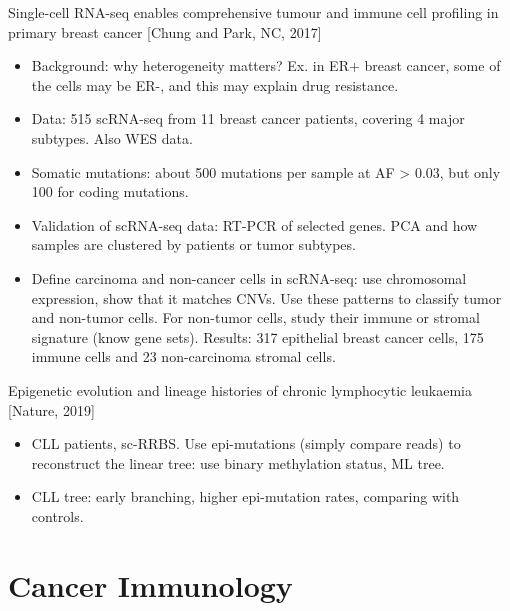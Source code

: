 \documentclass{report}
\begin{document}
Single-cell RNA-seq enables comprehensive tumour and immune cell profiling in primary breast cancer [Chung and Park, NC, 2017]
\begin{itemize}
	
	\item Background: why heterogeneity matters? Ex. in ER+ breast cancer, some of the cells may be ER-, and this may explain drug resistance.
	
	\item Data: 515 scRNA-seq from 11 breast cancer patients, covering 4 major subtypes. Also WES data. 
	
	\item Somatic mutations: about 500 mutations per sample at AF > 0.03, but only 100 for coding mutations.
	
	\item Validation of scRNA-seq data: RT-PCR of selected genes. PCA and how samples are clustered by patients or tumor subtypes.
	
	\item Define carcinoma and non-cancer cells in scRNA-seq: use chromosomal expression, show that it matches CNVs. Use these patterns to  classify tumor and non-tumor cells. For non-tumor cells, study their immune or stromal signature (know gene sets). Results: 317 epithelial breast cancer cells, 175 immune cells and 23 non-carcinoma stromal cells.  
\end{itemize}

Epigenetic evolution and lineage histories of chronic lymphocytic leukaemia [Nature, 2019]
\begin{itemize}
	\item CLL patients, sc-RRBS. Use epi-mutations (simply compare reads) to reconstruct the linear tree: use binary methylation status, ML tree.
	
	\item CLL tree: early branching, higher epi-mutation rates, comparing with controls.
\end{itemize}

\chapter{Cancer Immunology}
\end{document}
